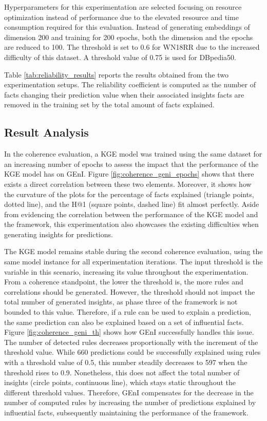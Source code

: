 Hyperparameters for this experimentation are selected focusing on resource optimization instead of performance due to the elevated resource and time consumption required for this evaluation. Instead of generating embeddings of dimension 200 and training for 200 epochs, both the dimension and the epochs are reduced to 100. The threshold is set to 0.6 for WN18RR due to the increased difficulty of this dataset. A threshold value of 0.75 is used for DBpedia50. 

Table \ref{tab:reliability_results} reports the results obtained from the two experimentation setups. The reliability coefficient is computed as the number of facts changing their prediction value when their associated insights facts are removed in the training set by the total amount of facts explained.

\subsection{Result Analysis}\label{6_sec:subsec:geni_results}
In the coherence evaluation, a KGE model was trained using the same dataset for an increasing number of epochs to assess the impact that the performance of the KGE model has on GEnI. Figure \ref{fig:coherence_geni_epochs} shows that there exists a direct correlation between these two elements. Moreover, it shows how the curvature of the plots for the percentage of facts explained (triangle points, dotted line), and the H@1 (square points, dashed line) fit almost perfectly. Aside from evidencing the correlation between the performance of the KGE model and the framework, this experimentation also showcases the existing difficulties when generating insights for predictions.

The KGE model remains stable during the second coherence evaluation, using the same model instance for all experimentation iterations. The input threshold is the variable in this scenario, increasing its value throughout the experimentation. From a coherence standpoint, the lower the threshold is, the more rules and correlations should be generated. However, the threshold should not impact the total number of generated insights, as phase three of the framework is not bounded to this value. Therefore, if a rule can be used to explain a prediction, the same prediction can also be explained based on a set of influential facts. Figure \ref{fig:coherence_geni_th} shows how GEnI successfully handles this issue. The number of detected rules decreases proportionally with the increment of the threshold value. While 660 predictions could be successfully explained using rules with a threshold value of 0.5, this number steadily decreases to 597 when the threshold rises to 0.9. Nonetheless, this does not affect the total number of insights (circle points, continuous line), which stays static throughout the different threshold values. Therefore, GEnI compensates for the decrease in the number of computed rules by increasing the number of predictions explained by influential facts, subsequently maintaining the performance of the framework. 

